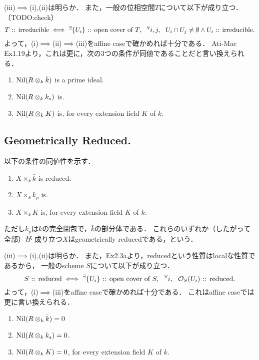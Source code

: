 \documentclass[a4paper]{jsarticle}
\begin{document}
    (iii)$\implies$(i),(ii)は明らか．
    また，一般の位相空間$T$について以下が成り立つ．
    （TODO:check）
    \[
        T\text{ :: irreducible}
        \iff
        {}^{\exists} \{U_i\}\text{ :: open cover of }T,~~
        {}^{\forall} i,j,~~ U_i \cap U_j \neq \emptyset \land U_i\text{ :: irreducible.}
    \]
    よって，(i)$\implies$(ii)$\implies$(iii)をaffine caseで確かめれば十分である．
    Ati-Mac Ex1.19より，これは更に，次の3つの条件が同値であることだと言い換えられる．
    \begin{enumerate}[label=(\roman*)]
        \item $\operatorname{Nil}(R \otimes_k \bar{k})$ is a prime ideal.
        \item $\operatorname{Nil}(R \otimes_k k_s)$ is.
        \item $\operatorname{Nil}(R \otimes_k K)$ is, for every extension field $K$ of $k$.
    \end{enumerate}

    \subsection{Geometrically Reduced.}
    以下の条件の同値性を示す．
    \begin{enumerate}[label=(\roman*)]
        \item $X \times_k \bar{k}$ is reduced.
        \item $X \times_k k_p$ is.
        \item $X \times_k K$ is, for every extension field $K$ of $k$.
    \end{enumerate}
    ただし$k_p$は$k$の完全閉包で，$\bar{k}$の部分体である．
    これらのいずれか（したがって全部）が
    成り立つ$X$はgeometrically reducedである，という．

    (iii)$\implies$(i),(ii)は明らか．
    また，Ex2.3aより，reducedという性質はlocalな性質であるから，
    一般のscheme $S$について以下が成り立つ．
    \[
        S\text{ :: reduced}
        \iff
        {}^{\exists} \{U_i\}\text{ :: open cover of }S,~~
        {}^{\forall} i,~~ \mathcal{O}_S(U_i)\text{ :: reduced.}
    \]
    よって，(i)$\implies$(iii)をaffine caseで確かめれば十分である．
    これはaffine caseでは更に言い換えられる．
    \begin{enumerate}[label=(\roman*)]
        \item $\operatorname{Nil}(R \otimes_k \bar{k})=0$
        \item $\operatorname{Nil}(R \otimes_k k_s)=0$.
        \item $\operatorname{Nil}(R \otimes_k K)=0$, for every extension field $K$ of $k$.
    \end{enumerate}
\end{document}
